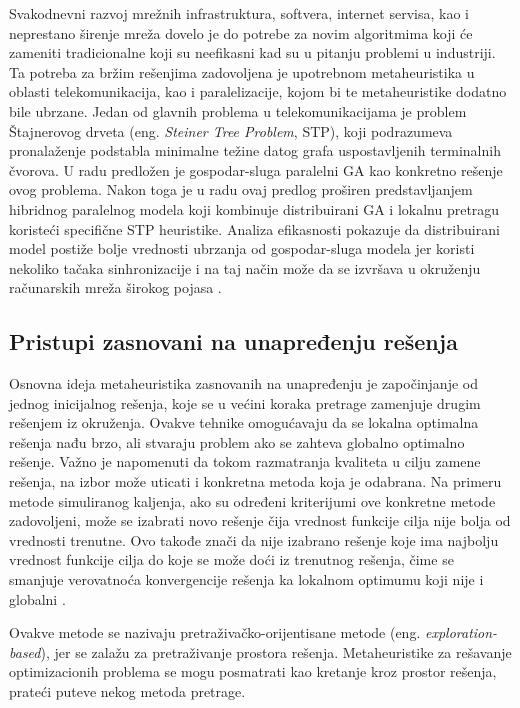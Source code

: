 \documentclass[a4paper]{article}
\begin{document}
Svakodnevni razvoj mrežnih infrastruktura, softvera, internet servisa, kao i neprestano širenje mreža dovelo je do potrebe za novim algoritmima koji će zameniti tradicionalne koji su neefikasni kad su u pitanju problemi u industriji. Ta potreba za bržim rešenjima zadovoljena je upotrebnom metaheuristika u oblasti telekomunikacija, kao i paralelizacije, kojom bi te metaheuristike dodatno bile ubrzane. Jedan od glavnih problema u telekomunikacijama je problem Štajnerovog drveta (eng. \textit{Steiner Tree Problem}, STP), koji podrazumeva pronalaženje podstabla minimalne težine datog grafa uspostavljenih terminalnih čvorova. U radu \cite{fatta} predložen je gospodar-sluga paralelni GA kao konkretno rešenje ovog problema. Nakon toga je u radu \cite{martins} ovaj predlog proširen predstavljanjem hibridnog paralelnog modela koji kombinuje distribuirani GA i lokalnu pretragu koristeći specifične STP heuristike. Analiza efikasnosti pokazuje da distribuirani model postiže bolje vrednosti ubrzanja od gospodar-sluga modela jer koristi nekoliko tačaka sinhronizacije i na taj način može da se izvršava u okruženju računarskih mreža širokog pojasa \cite{alba}.

\subsection{Pristupi zasnovani na unapređenju rešenja}
\label{sec:ParalelizacijaJednog}

Osnovna ideja metaheuristika zasnovanih na unapređenju je započinjanje od jednog inicijalnog rešenja, koje se u većini koraka pretrage zamenjuje drugim rešenjem iz okruženja. Ovakve tehnike omogućavaju da se lokalna optimalna rešenja nađu brzo, ali stvaraju problem ako se zahteva globalno optimalno rešenje. Važno je napomenuti da tokom razmatranja kvaliteta u cilju zamene rešenja, na izbor može uticati i konkretna metoda koja je odabrana.
Na primeru metode simuliranog kaljenja, ako su određeni kriterijumi ove konkretne metode zadovoljeni, može se izabrati novo rešenje čija vrednost funkcije cilja nije bolja od vrednosti trenutne. Ovo takođe znači da nije izabrano rešenje koje ima najbolju vrednost funkcije cilja do koje se može doći iz trenutnog rešenja, čime se smanjuje verovatnoća konvergencije rešenja ka lokalnom optimumu koji nije i globalni \cite{talbi}.

Ovakve metode se nazivaju pretraživačko-orijentisane metode (eng. \textit{exploration-based}), jer se zalažu za pretraživanje prostora rešenja.
Metaheuristike za rešavanje optimizacionih problema se mogu 
posmatrati kao kretanje kroz prostor rešenja, prateći puteve nekog metoda pretrage.
\end{document}
